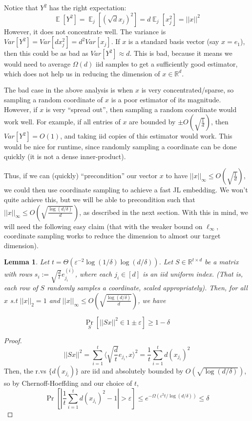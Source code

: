 \documentclass[]{article}
\newtheorem{lemma}{Lemma}
\newcommand{\1}{\mathbbm{1}}
\newcommand{\x}{\times}
\newcommand{\R}{\mathbb{R}}
\newcommand{\E}{\mathop{\mathbb{E}}}
\renewcommand{\epsilon}{\varepsilon}
\newcommand{\innp}[1]{\langle #1 \rangle}
\begin{document}
Notice that $Y^2$ has the right expectation:
$$\E[Y^2] = \E_j[(\sqrt{d} x_j)^2] = d \E_j[x_j^2] = ||x||^2$$
However, it does not concentrate well. The variance is
$Var[Y^2] = Var[d x_j^2] = d^2 Var[x_j]$.
If $x$ is a standard basis vector (say $x = e_1$),
then this could be as bad as $Var[Y^2] \approx d$.
This is bad, because it means we would need to average $\Omega(d)$ iid samples to get a
sufficiently good estimator, which does not help us in reducing the dimension of
$x \in \R^d$.

The bad case in the above analysis is when $x$ is very
concentrated/sparse, so sampling a random coordinate of $x$ is a poor
estimator of its magnitude.
However, if $x$ is very ``spread out'', then sampling a
random coordinate would work well.
For example, if all entries of $x$ are bounded by $\pm O(\sqrt{\frac{1}{d}})$,
then $Var[Y^2] = O(1)$, and taking iid copies of this estimator would work.
This would be nice for runtime, since randomly sampling a coordinate can be done quickly (it
is not a dense inner-product).

Thus, if we can (quickly) ``precondition'' our vector $x$ to have
$||x||_{\infty} \leq O(\sqrt{\frac{1}{d}})$, we could then use coordinate
sampling to achieve a fast JL embedding.
We won't quite achieve this, but we will be able to precondition such that
$||x||_\infty \leq O(\sqrt{\frac{\log(d/\delta)}{d}})$, as described in the next
section.
With this in mind, we will need the following easy claim (that with the weaker
bound on $\ell_\infty$, coordinate sampling works to reduce the dimension
to almost our target dimension).

\begin{lemma}
    \label{lem:S}
    Let $t = \Theta(\epsilon^{-2}\log(1/\delta)\log(d/\delta))$.
    Let $S \in \R^{t \x d}$ be a matrix
    with rows $s_i := \sqrt{\frac{d}{t}} e^{(i)}_{j_i}$,
    where each $j_i \in [d]$ is an iid uniform index.
    (That is, each row of $S$ randomly samples a coordinate, scaled
    appropriately).
    Then, for all $x$ s.t $||x||_2=1$ and $||x||_\infty \leq O(\sqrt{\frac{\log(d/\delta)}{d}})$,
    we have

    $$\Pr_{S}[ ||Sx||^2 \in 1 \pm \epsilon] \geq 1-\delta$$
\end{lemma}
\begin{proof}
$$||Sx||^2
= \sum_{i=1}^t \innp{\sqrt{\frac{d}{t}} e_{j_i}, x}^2
= \frac{1}{t}\sum_{i=1}^t d (x_{j_i})^2$$
Then, the r.vs $\{d (x_{j_i})\}$ are iid and absolutely bounded by
$O(\sqrt{\log(d/\delta)})$, so by Chernoff-Hoeffding and our choice of $t$,
$$\Pr[ |\frac{1}{t}\sum_{i=1}^t d (x_{j_i})^2 - 1| > \epsilon]
\leq e^{-\Omega(\epsilon^2 t / \log(d/\delta))} \leq \delta$$
\end{proof}
\end{document}
